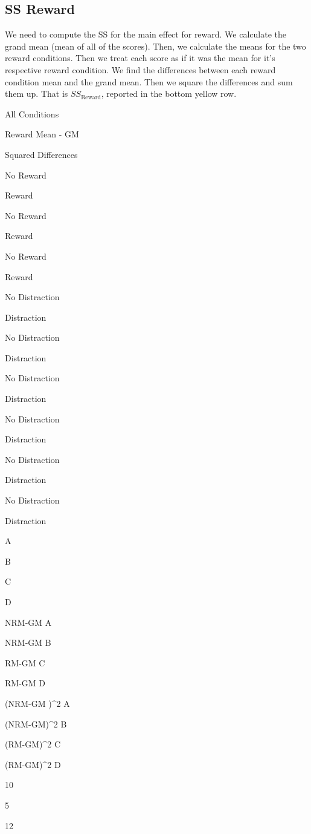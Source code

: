 \documentclass[
]{book}
\begin{document}
\hypertarget{ss-reward}{%
\subsection{SS Reward}\label{ss-reward}}

We need to compute the SS for the main effect for reward. We calculate the grand mean (mean of all of the scores). Then, we calculate the means for the two reward conditions. Then we treat each score as if it was the mean for it's respective reward condition. We find the differences between each reward condition mean and the grand mean. Then we square the differences and sum them up. That is \(SS_\text{Reward}\), reported in the bottom yellow row.

All Conditions

Reward Mean - GM

Squared Differences

No Reward

Reward

No Reward

Reward

No Reward

Reward

No Distraction

Distraction

No Distraction

Distraction

No Distraction

Distraction

No Distraction

Distraction

No Distraction

Distraction

No Distraction

Distraction

A

B

C

D

NRM-GM A

NRM-GM B

RM-GM C

RM-GM D

(NRM-GM )\^{}2 A

(NRM-GM)\^{}2 B

(RM-GM)\^{}2 C

(RM-GM)\^{}2 D

10

5

12
\end{document}
